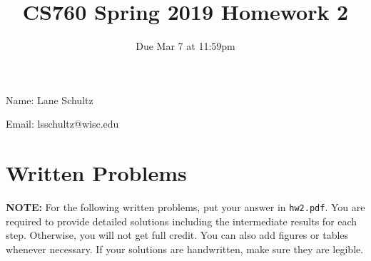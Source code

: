 \documentclass{article}
\title{CS760 Spring 2019 Homework 2}
\author{Due Mar 7 at 11:59pm}
\date{}
\begin{document}
\maketitle



Name: Lane Schultz 

Email: lsschultz@wisc.edu



\section*{Written Problems}

\textbf{NOTE:} For the following written problems, put your answer in \texttt{hw2.pdf}. You are required to provide detailed solutions including the intermediate results for each step. Otherwise, you will not get full credit. You can also add figures or tables whenever necessary. If your solutions are handwritten, make sure they are legible.
\end{document}

